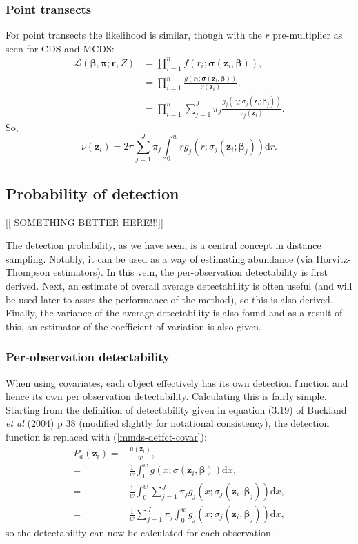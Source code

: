 \subsubsection{Point transects}
For point transects the likelihood is similar, though with the $r$ pre-multiplier as seen for CDS and MCDS:
\begin{align}
\mathcal{L}(\bm{\beta}, \bm{\pi} ; \bm{r}, Z) &= \prod_{i=1}^n f(r_i;\bm{\sigma}(\bm{z}_i, \bm{\beta})),\\
&= \prod_{i=1}^n \frac{g(r_i;\bm{\sigma}(\bm{z}_i, \bm{\beta}))}{\nu(\bm{z}_i)},\\
&= \prod_{i=1}^n \sum_{j=1}^J \pi_j \frac{g_j(r_i; \sigma_j(\bm{z}_i;\bm{\beta}_j))}{ \nu_j(\bm{z}_i)}.
\label{mmds-pt-glikelihood}
\end{align}
So,
\begin{equation}
\nu(\bm{z}_i) = 2 \pi \sum_{j=1}^J \pi_j \int_0^w r g_j(r; \sigma_j(\bm{z}_i;\bm{\beta}_j)) \text{d}r.
\end{equation}


\subsection{Probability of detection}

[[ SOMETHING BETTER HERE!!!]]

The detection probability, as we have seen, is a central concept in distance sampling. Notably, it can be used as a way of estimating abundance (via Horvitz-Thompson estimators). In this vein, the per-observation detectability is first derived. Next, an estimate of overall average detectability is often useful (and will be used later to asses the performance of the method), so this is also derived. Finally, the variance of the average detectability is also found and as a result of this, an estimator of the coefficient of variation is also given.

\subsubsection{Per-observation detectability}
When using covariates, each object effectively has its own detection function and hence its own per observation detectability. Calculating this is fairly simple. Starting from the definition of detectability given in equation (3.19) of Buckland \textit{et al} (2004) p 38 (modified slightly for notational consistency), the detection function is replaced with (\ref{mmds-detfct-covar}):
\begin{align*}
P_a(\bm{z}_i) =& \frac{\mu(\bm{z}_i)}{w},\\
=& \frac{1}{w} \int_0^w g(x; \sigma(\bm{z}_i,\bm{\beta})) \text{d}x,\\
=& \frac{1}{w} \int_0^w \sum_{j=1}^J \pi_j g_j(x; \sigma_j(\bm{z}_i, \bm{\beta}_j)) \text{d}x,\\
=& \frac{1}{w} \sum_{j=1}^J \pi_j \int_0^w  g_j(x; \sigma_j(\bm{z}_i, \bm{\beta}_j)) \text{d}x,
\end{align*}
so the detectability can now be calculated for each observation.


